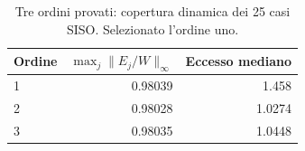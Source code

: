 \par
\begin{table}[htbp]\centering\small
\setlength{\tabcolsep}{4pt}
\begin{tabular}{lrr}\toprule
Ordine & $\max_j\|E_j/W\|_\infty$ & Eccesso mediano\\\midrule
1 & 0.98039 & 1.458\\
2 & 0.98028 & 1.0274\\
3 & 0.98035 & 1.0448\\
\bottomrule\end{tabular}
\caption{Tre ordini provati: copertura dinamica dei 25 casi SISO. Selezionato l'ordine uno.}
\end{table}
\par
